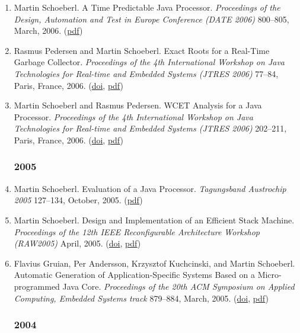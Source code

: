\begin{enumerate}
\item Martin Schoeberl.
 A Time Predictable Java Processor.
 \emph{Proceedings of the Design, Automation and Test in Europe Conference (DATE 2006)} 800--805, March, 2006.
(\href{http://www.jopdesign.com/doc/jop_wcet.pdf}{pdf})

\item Rasmus Pedersen and Martin Schoeberl.
 Exact Roots for a Real-Time Garbage Collector.
 \emph{Proceedings of the 4th International Workshop on Java Technologies for Real-time and Embedded Systems (JTRES 2006)} 77--84, Paris, France, 2006.
(\href{http://dx.doi.org/10.1145/1167999.1168013}{doi}, \href{http://www.jopdesign.com/doc/gcroots_jtres2006.pdf}{pdf})

\item Martin Schoeberl and Rasmus Pedersen.
 WCET Analysis for a Java Processor.
 \emph{Proceedings of the 4th International Workshop on Java Technologies for Real-time and Embedded Systems (JTRES 2006)} 202--211, Paris, France, 2006.
(\href{http://dx.doi.org/10.1145/1167999.1168033}{doi}, \href{http://www.jopdesign.com/doc/wcet_jtres2006.pdf}{pdf})


\subsubsection*{2005}

\item Martin Schoeberl.
 Evaluation of a Java Processor.
 \emph{Tagungsband Austrochip 2005} 127--134, October, 2005.
(\href{http://www.jopdesign.com/doc/jop_eval.pdf}{pdf})

\item Martin Schoeberl.
 Design and Implementation of an Efficient Stack Machine.
 \emph{Proceedings of the 12th IEEE Reconfigurable Architecture Workshop (RAW2005)} April, 2005.
(\href{http://dx.doi.org/10.1109/IPDPS.2005.161}{doi}, \href{http://www.jopdesign.com/doc/stack.pdf}{pdf})

\item Flavius Gruian, Per Andersson, Krzysztof Kuchcinski, and Martin Schoeberl.
 Automatic Generation of Application-Specific Systems Based on a Micro-programmed Java Core.
 \emph{Proceedings of the 20th ACM Symposium on Applied Computing, Embedded Systems track} 879--884, March, 2005.
(\href{http://dx.doi.org/10.1145/1066677.1066877}{doi}, \href{http://www.jopdesign.com/doc/sac05.pdf}{pdf})


\subsubsection*{2004}


\end{enumerate}
